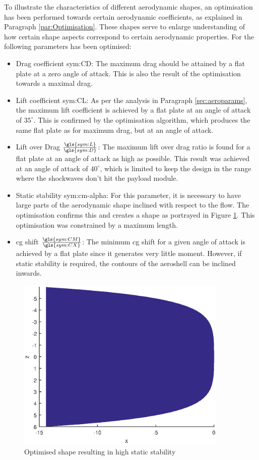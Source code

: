 To illustrate the characteristics of different aerodynamic shapes, an optimisation has been performed towards certain aerodynamic coefficients, as explained in Paragraph \ref{par:Optimisation}. These shapes serve to enlarge understanding of how certain shape aspects correspond to certain aerodynamic properties. For the following parameters has been optimised:
\begin{itemize}
	\item Drag coefficient \gls{sym:CD}: The maximum drag should be attained by a flat plate at a zero angle of attack. This is also the result of the optimisation towards a maximal drag.
	\item Lift coefficient \gls{sym:CL}: As per the analysis in Paragraph \ref{sec:aeroparams}, the maximum lift coefficient is achieved by a flat plate at an angle of attack of $35^\circ$. This is confirmed by the optimisation algorithm, which produces the same flat plate as for maximum drag, but at an angle of attack.
	\item Lift over Drag $\frac{\gls{sym:L}}{\gls{sym:D}}$: The maximum lift over drag ratio is found for a flat plate at an angle of attack as high as possible. This result was achieved at an angle of attack of $40^\circ$, which is limited to keep the design in the range where the shockwaves don't hit the payload module.
	\item Static stability \gls{sym:cm-alpha}: For this parameter, it is necessary to have large parts of the aerodynamic shape inclined with respect to the flow. The optimisation confirms this and creates a shape as portrayed in Figure \ref{fig:highcmalphashape}. This optimisation was constrained by a maximum length.
	\item \gls{cg} shift $\frac{\gls{sym:CM}}{\gls{sym:CX}}$: The minimum \gls{cg} shift for a given angle of attack is achieved by a flat plate since it generates very little moment. However, if static stability is required, the contours of the aeroshell can be inclined inwards.
\end{itemize}


\begin{figure}
	\includegraphics[width=0.9\textwidth]{./Figure/Aerodynamics/cmalphamax.eps}
	\caption{Optimised shape resulting in high static stability}
	\label{fig:highcmalphashape}
\end{figure}
	


